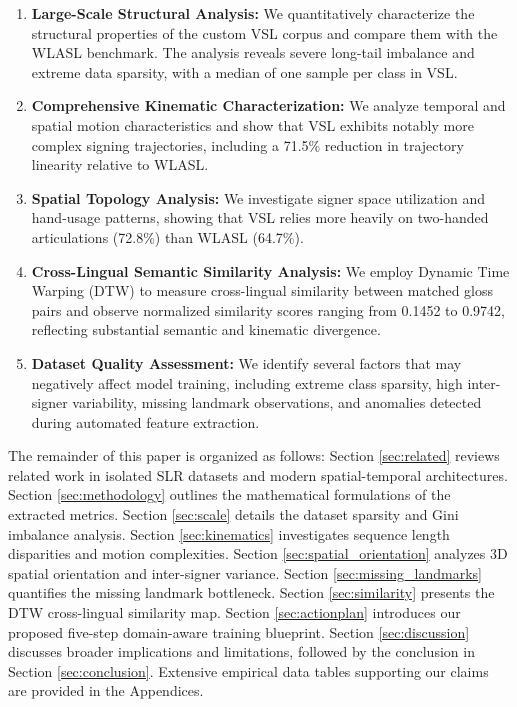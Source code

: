 \documentclass{ieeeaccess}
\begin{document}
\begin{enumerate}
\item \textbf{Large-Scale Structural Analysis:}
We quantitatively characterize the structural properties of the custom VSL corpus and compare them with the WLASL benchmark. The analysis reveals severe long-tail imbalance and extreme data sparsity, with a median of one sample per class in VSL.

\item \textbf{Comprehensive Kinematic Characterization:}
We analyze temporal and spatial motion characteristics and show that VSL exhibits notably more complex signing trajectories, including a 71.5\% reduction in trajectory linearity relative to WLASL.

\item \textbf{Spatial Topology Analysis:}
We investigate signer space utilization and hand-usage patterns, showing that VSL relies more heavily on two-handed articulations (72.8\%) than WLASL (64.7\%).

\item \textbf{Cross-Lingual Semantic Similarity Analysis:}
We employ Dynamic Time Warping (DTW) to measure cross-lingual similarity between matched gloss pairs and observe normalized similarity scores ranging from 0.1452 to 0.9742, reflecting substantial semantic and kinematic divergence.

\item \textbf{Dataset Quality Assessment:}
We identify several factors that may negatively affect model training, including extreme class sparsity, high inter-signer variability, missing landmark observations, and anomalies detected during automated feature extraction.
\end{enumerate}

The remainder of this paper is organized as follows: Section \ref{sec:related} reviews related work in isolated SLR datasets and modern spatial-temporal architectures. Section \ref{sec:methodology} outlines the mathematical formulations of the extracted metrics. Section \ref{sec:scale} details the dataset sparsity and Gini imbalance analysis. Section \ref{sec:kinematics} investigates sequence length disparities and motion complexities. Section \ref{sec:spatial_orientation} analyzes 3D spatial orientation and inter-signer variance. Section \ref{sec:missing_landmarks} quantifies the missing landmark bottleneck. Section \ref{sec:similarity} presents the DTW cross-lingual similarity map. Section \ref{sec:actionplan} introduces our proposed five-step domain-aware training blueprint. Section \ref{sec:discussion} discusses broader implications and limitations, followed by the conclusion in Section \ref{sec:conclusion}. Extensive empirical data tables supporting our claims are provided in the Appendices.
\end{document}
